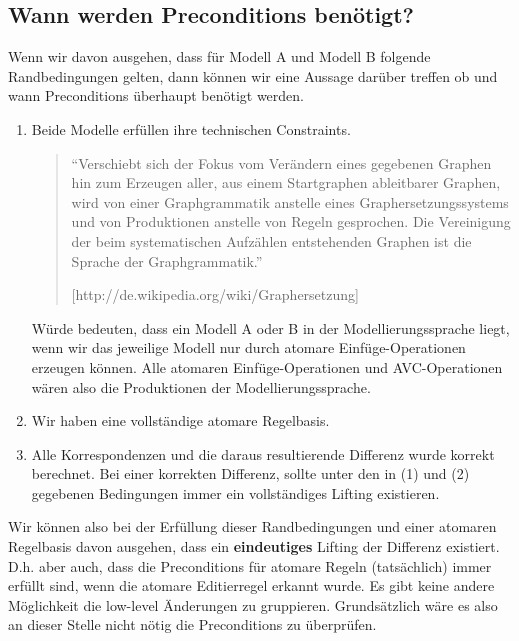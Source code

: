 \subsection{Wann werden Preconditions benötigt?}

Wenn wir davon ausgehen, dass für Modell A und Modell B folgende Randbedingungen gelten, dann können
wir eine Aussage darüber treffen ob und wann Preconditions überhaupt benötigt werden.

\begin{enumerate}
  \item Beide Modelle erfüllen ihre technischen Constraints. 
  
  \begin{quote}
  	"`Verschiebt sich der Fokus vom Verändern eines gegebenen Graphen hin zum Erzeugen aller, aus
  	einem Startgraphen ableitbarer Graphen, wird von einer Graphgrammatik anstelle eines
  	Graphersetzungssystems und von Produktionen anstelle von Regeln gesprochen. Die Vereinigung der
  	beim systematischen Aufzählen entstehenden Graphen ist die Sprache der Graphgrammatik."'
    
    [http://de.wikipedia.org/wiki/Graphersetzung]
  \end{quote}
  
  Würde bedeuten, dass ein Modell A oder B in der Modellierungssprache liegt, wenn wir das jeweilige
  Modell nur durch atomare Einfüge-Operationen erzeugen können. Alle atomaren Einfüge-Operationen
  und AVC-Operationen wären also die Produktionen der Modellierungssprache.
  
  \item Wir haben eine vollständige atomare Regelbasis.
  
  \item Alle Korrespondenzen und die daraus resultierende Differenz wurde korrekt berechnet. Bei
  einer korrekten Differenz, sollte unter den in (1) und (2) gegebenen Bedingungen immer ein
  vollständiges Lifting existieren.
\end{enumerate}

Wir können also bei der Erfüllung dieser Randbedingungen und einer atomaren Regelbasis davon
ausgehen, dass ein \textbf{eindeutiges} Lifting der Differenz existiert. D.h. aber auch, dass die
Preconditions für atomare Regeln (tatsächlich) immer erfüllt sind, wenn die atomare Editierregel
erkannt wurde. Es gibt keine andere Möglichkeit die low-level Änderungen zu gruppieren.
Grundsätzlich wäre es also an dieser Stelle nicht nötig die Preconditions zu überprüfen.

